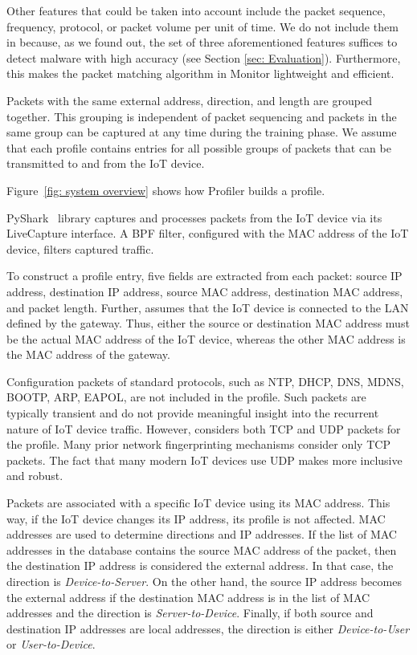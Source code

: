 Other features that could be taken into account include the packet sequence, frequency, protocol, or packet volume per unit of time. We do not include them in \system{} because, as we found out, the set of three aforementioned features suffices to detect malware with high accuracy (see Section \ref{sec: Evaluation}). Furthermore, this makes the packet matching algorithm in Monitor lightweight and efficient.

Packets with the same external address, direction, and length are grouped together. This grouping is independent of packet sequencing and packets in the same group can be captured at any time during the training phase. We assume that each profile contains entries for all possible groups of packets that can be transmitted to and from the IoT device. 

Figure~\ref{fig: system overview} shows how Profiler builds a profile. 

PyShark~\cite{pyshark} library captures and processes packets from the IoT device via its LiveCapture interface. A BPF filter, configured with the MAC address of the IoT device, filters captured traffic. 

To construct a profile entry, five fields are extracted from each packet: source IP address, destination IP address, source MAC address, destination MAC address, and packet length. Further, \system{} assumes that the IoT device is connected to the LAN defined by the gateway. Thus, either the source or destination MAC address must be the actual MAC address of the IoT device, whereas the other MAC address is the MAC address of the gateway.  

Configuration packets of standard protocols, such as NTP, DHCP, DNS, MDNS, BOOTP, ARP, EAPOL, are not included in the profile. Such packets are typically transient and do not provide meaningful insight into the recurrent nature of IoT device traffic. However, \system{} considers both TCP and UDP packets for the profile. Many prior network fingerprinting mechanisms \cite{trimananda2020packet,oconnor2019homesnitch} consider only TCP packets. The fact that many modern IoT devices use UDP makes \system{} more inclusive and robust.

Packets are associated with a specific IoT device using its MAC address. This way, if the IoT device changes its IP address, its profile is not affected. MAC addresses are used to determine directions and IP addresses. If the list of MAC addresses in the database contains the source MAC address of the packet, then the destination IP address is considered the external address. In that case, the direction is \textit{Device-to-Server}. On the other hand, the source IP address becomes the external address if the destination MAC address is in the list of MAC addresses and the direction is \textit{Server-to-Device}. Finally, if both source and destination IP addresses are local addresses, the direction is either \textit{Device-to-User} or \textit{User-to-Device}. 

